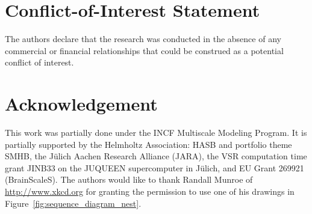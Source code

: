\documentclass{frontiersSCNS} %
\begin{document}

\section*{Conflict-of-Interest Statement}
The authors declare that the research was conducted in the absence of
any commercial or financial relationships that could be construed as a
potential conflict of interest.

\section*{Acknowledgement}
This work was partially done under the INCF Multiscale Modeling
Program. It is partially supported by the Helmholtz Association: HASB
and portfolio theme SMHB, the Jülich Aachen Research Alliance (JARA),
the VSR computation time grant JINB33 on the JUQUEEN supercomputer in
Jülich, and EU Grant 269921 (BrainScaleS). The authors would like to
thank Randall Munroe of \url{http://www.xkcd.org} for granting the
permission to use one of his drawings in
Figure~\ref{fig:sequence_diagram_nest}.



\end{document}
